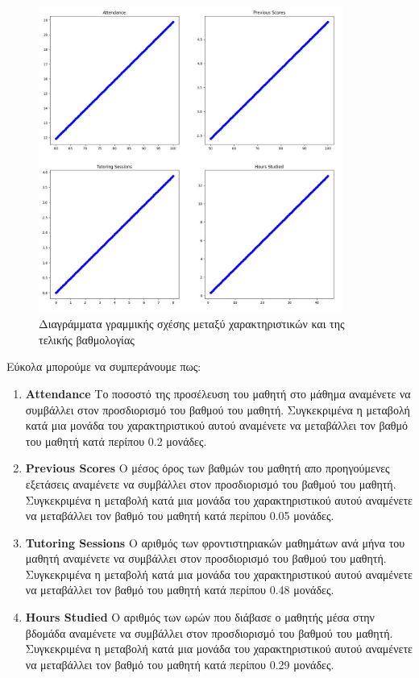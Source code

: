 \documentclass[12pt]{article}
\begin{document}
\begin{figure}
    \centering
    \includegraphics[width=0.89\textwidth]{./images/icon12.jpg}
    \caption{Διαγράμματα γραμμικής σχέσης μεταξύ χαρακτηριστικών και της τελικής βαθμολογίας}
    \label{fig:Plots}
\end{figure}

Εύκολα μπορούμε να συμπεράνουμε πως: \\

\begin{enumerate}
    \item \textbf{Attendance} Το ποσοστό της προσέλευση του μαθητή στο μάθημα αναμένετε
 να συμβάλλει στον προσδιορισμό του βαθμού του μαθητή. Συγκεκριμένα η μεταβολή κατά μια μονάδα του χαρακτηριστικού αυτού αναμένετε να μεταβάλλει τον βαθμό του μαθητή κατά περίπου 0.2 μονάδες.
 
 	\item \textbf{Previous Scores} Ο μέσος όρος των βαθμών του μαθητή απο προηγούμενες εξετάσεις αναμένετε
 να συμβάλλει στον προσδιορισμό του βαθμού του μαθητή. Συγκεκριμένα η μεταβολή κατά μια μονάδα του χαρακτηριστικού αυτού αναμένετε να μεταβάλλει τον βαθμό του μαθητή κατά περίπου 0.05 μονάδες.
 
 \item \textbf{Tutoring Sessions} Ο αριθμός των φροντιστηριακών μαθημάτων ανά μήνα του μαθητή αναμένετε
 να συμβάλλει στον προσδιορισμό του βαθμού του μαθητή. Συγκεκριμένα η μεταβολή κατά μια μονάδα του χαρακτηριστικού αυτού αναμένετε να μεταβάλλει τον βαθμό του μαθητή κατά περίπου 0.48 μονάδες.
 
 \item \textbf{Hours Studied} Ο αριθμός των ωρών που διάβασε ο μαθητής μέσα στην βδομάδα αναμένετε
 να συμβάλλει στον προσδιορισμό του βαθμού του μαθητή. Συγκεκριμένα η μεταβολή κατά μια μονάδα του χαρακτηριστικού αυτού αναμένετε να μεταβάλλει τον βαθμό του μαθητή κατά περίπου 0.29 μονάδες.
 
\end{enumerate}
 
\end{document}
